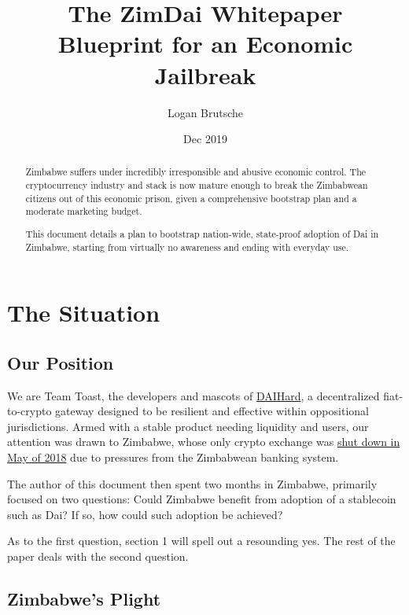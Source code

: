 \documentclass{article}
\title{The ZimDai Whitepaper\\
	\large Blueprint for an Economic Jailbreak
}
\date{Dec 2019}
\author{Logan Brutsche}
\begin{document}

\maketitle
\begin{abstract}
	\setlength{\parskip}{1em}
	Zimbabwe suffers under incredibly irresponsible and abusive economic control. The cryptocurrency industry and stack is now mature enough to break the Zimbabwean citizens out of this economic prison, given a comprehensive bootstrap plan and a moderate marketing budget.
		
	This document details a plan to bootstrap nation-wide, state-proof adoption of Dai in Zimbabwe, starting from virtually no awareness and ending with everyday use.
\end{abstract}

\newpage
{}
\tableofcontents

\setlength{\parskip}{0.5em}

\newpage
{}
\section{The Situation} \label{situation}

\subsection{Our Position} \label{position}

We are Team Toast, the developers and mascots of \href{daihard.io}{DAIHard}, a decentralized fiat-to-crypto gateway designed to be resilient and effective within oppositional jurisdictions. Armed with a stable product needing liquidity and users, our attention was drawn to Zimbabwe, whose only crypto exchange was \href{https://www.techzim.co.zw/2018/05/golix-ordered-to-shut-down-by-rbz/}{shut down in May of 2018} due to pressures from the Zimbabwean banking system.

The author of this document then spent two months in Zimbabwe, primarily focused on two questions: Could Zimbabwe benefit from adoption of a stablecoin such as Dai? If so, how could such adoption be achieved?

As to the first question, section 1 will spell out a resounding yes. The rest of the paper deals with the second question.

\subsection{Zimbabwe's Plight} \label{zimbabwe}
\end{document}
